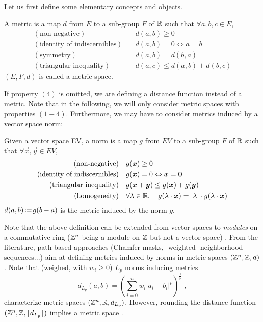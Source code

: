 \documentclass{llncs}
\begin{document}
Let us first define some elementary concepts and objects.
\begin{definition}
  \label{def:distance}
  A metric is a map $d$ from $E$ to a sub-group $F$ of ${\mathbb{R}}$ such that
  $\forall a,b,c\in E$,
  \begin{align}
    (\text{non-negative})\quad & d(a,b)\geq 0\\
    (\text{identity of indiscernibles}) \quad&  d(a,b)= 0
    \Leftrightarrow a=b\\
    (\text{symmetry})\quad &  d(a,b)=d(b,a)\\
    (\text{triangular inequality})\quad &   d(a,c) \leq d(a,b) + d(b,c)
  \end{align}
$(E, F, d)$ is called a metric space.
\end{definition}
If property $(4)$ is omitted, we are defining a distance function
instead of a metric. Note that in the following, we will only consider
metric spaces with properties $(1-4)$. Furthermore, we may have to
consider  metrics induced by a vector space norm:
\begin{definition}
  \label{def:distance}
  Given a vector space EV, a norm is a map $g$ from  $EV$ to a sub-group
  $F$ of ${\mathbb{R}}$ such that $\forall \vec{x},\vec{y}\in EV$,
  \begin{align}
    (\text{non-negative})\quad & g(\vec{x})\geq 0\\
    (\text{identity of indiscernibles}) \quad&  g(\vec{x})= 0
    \Leftrightarrow \vec{x}=\vec{0}\\
    (\text{triangular inequality})\quad &   g(\vec{x}+\vec{y}) \leq
    g(\vec{x}) + g(\vec{y})\\
    (\text{homogeneity})\quad &  \forall \lambda\in\R, \quad
    g(\lambda\cdot\vec{x}) = |\lambda|\cdot g(\lambda\cdot\vec{x})
  \end{align}
$d(a,b) \!\mathrel{\mathop:}=\! g(b-a)$ is the metric induced by the
  norm $g$.
\end{definition}
Note that the above definition can be extended from vector spaces to
\emph{modules} on a commutative ring (${\mathbb{Z}}^n$ being a module on ${\mathbb{Z}}$
but not a vector space) \cite{Thiel_hdr}.
From the literature, path-based approaches (Chamfer masks, -weighted-
neighborhood sequences...)  aim at defining metrics induced by norms
in metric spaces $({\mathbb{Z}}^n, {\mathbb{Z}} , d)$.  Note that (weighed, with $w_i\geq 0$) $L_p$ norms inducing
metrics
\begin{equation}
    d_{L_p} (a,b) = \left ( \sum_{i=0}^n w_i|a_i-b_i |^p \right )^{\frac{1}{p}}\;,
  \end{equation}
characterize metric spaces $({\mathbb{Z}}^n, {\mathbb{R}} , d_{L_p})$. However,
rounding the distance function $({\mathbb{Z}}^n,{\mathbb{Z}}, \lceil d_{L_p}\rceil)$ implies a
metric space \cite{klette_book}.
\end{document}
